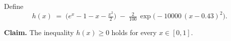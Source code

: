 \begin{problem}
Define
\[
  h(x) \;=\; \bigl(e^{x} - 1 - x - \tfrac{x^{2}}{2}\bigr)
            \;-\; \tfrac{2}{100}\,\exp\!\bigl(-10000\,(x - 0.43)^{2}\bigr).
\]

\textbf{Claim.} The inequality $h(x) \geq 0$ holds for every
$x \in [0, 1]$.
\end{problem}
